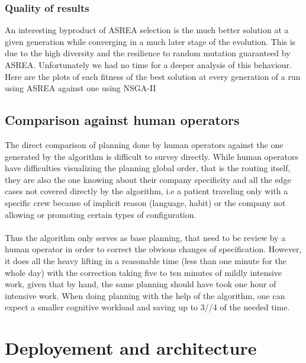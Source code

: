 \documentclass[12pt]{memoir}
\begin{document}
\subsubsection{Quality of results}
An interesting byproduct of ASREA selection is the much better solution at a given generation while converging
in a much later stage of the evolution. This is due to the high diversity and the resilience to random mutation
guaranteed by ASREA. Unfortunately we had no time for a deeper analysis of this behaviour. Here are the plots of
each fitness of the best solution at every generation of a run using ASREA against one using NSGA-II

\subsection{Comparison against human operators}
The direct comparison of planning done by human operators against the one generated by the algorithm is difficult
to survey directly. While human operators have difficulties visualizing the planning global order, that is the routing
itself, they are also the one knowing about their company specificity and all the edge cases not covered directly by
the algorithm, i.e a patient traveling only with a specific crew because of implicit reason (language, habit) or the company
not allowing or promoting certain types of configuration.\\
\\
Thus the algorithm only serves as base planning, that need to be review by a human operator in order to correct
the obvious changes of specification. However, it does all the heavy lifting in a reasonable time (less than one minute
for the whole day) with the correction taking five to ten minutes of mildly intensive work, given that by hand, the same planning
should have took one hour of intensive work. When doing planning with the help of the algorithm, one can expect a smaller
cognitive workload and saving up to 3//4 of the needed time.  

\section{Deployement and architecture}
\end{document}
